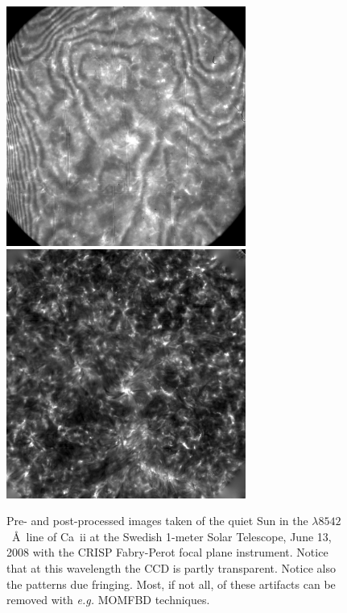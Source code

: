 \begin{figure}[p]
	\centering
		\includegraphics[width=0.7\textwidth]{camXXV_13Jun2008_8542_raw.eps}
		\includegraphics[width=0.7\textwidth]{camXXV_13Jun2008_8542_momfbd.eps}
	\caption{Pre- and post-processed images taken of the quiet Sun in the 
	$\lambda 8542$~\AA\ line of Ca~{\sc ii} at the Swedish 1-meter Solar 
	Telescope, June 13, 2008 with the CRISP Fabry-Perot focal plane instrument. 
	Notice that at this wavelength the CCD is partly transparent.
	Notice also the patterns due fringing. Most, if not all, of these
	artifacts can be removed with {\it e.g.} MOMFBD techniques.}
	\label{fig:crisp8542raw-momfbd}
\end{figure}

